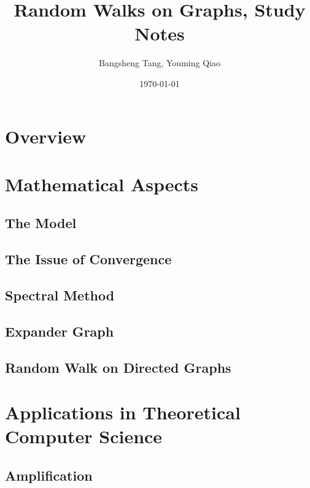 \documentclass[11pt]{report}
\begin{document}
\title{Random Walks on Graphs, Study Notes}
\author{Bangsheng Tang, Youming Qiao}
\date{\today}
\maketitle \tableofcontents

\chapter{Overview}


\chapter{Mathematical Aspects}

\section{The Model}



\section{The Issue of Convergence}


\section{Spectral Method}


\section{Expander Graph}


\section{Random Walk on Directed Graphs}


\chapter{Applications in Theoretical Computer Science}

\section{Amplification}


%

%

%

%


\end{document}
